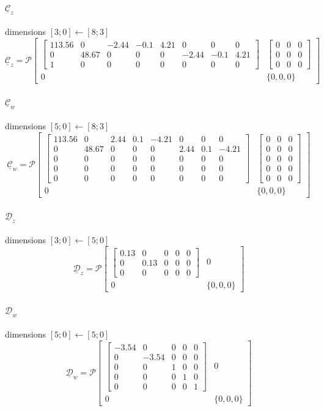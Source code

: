 \documentclass{article}
\newcommand{\PIop}[6]{\mathcal P\!\left[\begin{array}{c|c}#1&#2\\\hline#3&\{#4,#5,#6\}\end{array}\right]}
\begin{document}
\paragraph{$\underline{\mathcal C}_z$}\hfill dimensions $[3;0]\leftarrow[8;3]$
\[\displaystyle \underline{\mathcal C}_z=\PIop{\begin{bmatrix}113.56 & 0 & -2.44 & -0.1 & 4.21 & 0 & 0 & 0\\0 & 48.67 & 0 & 0 & 0 & -2.44 & -0.1 & 4.21\\1 & 0 & 0 & 0 & 0 & 0 & 0 & 0\end{bmatrix}}{\begin{bmatrix}0 & 0 & 0\\0 & 0 & 0\\0 & 0 & 0\end{bmatrix}}{0}{0}{0}{0}\]
\paragraph{$\underline{\mathcal C}_w$}\hfill dimensions $[5;0]\leftarrow[8;3]$
\[\displaystyle \underline{\mathcal C}_w=\PIop{\begin{bmatrix}113.56 & 0 & 2.44 & 0.1 & -4.21 & 0 & 0 & 0\\0 & 48.67 & 0 & 0 & 0 & 2.44 & 0.1 & -4.21\\0 & 0 & 0 & 0 & 0 & 0 & 0 & 0\\0 & 0 & 0 & 0 & 0 & 0 & 0 & 0\\0 & 0 & 0 & 0 & 0 & 0 & 0 & 0\end{bmatrix}}{\begin{bmatrix}0 & 0 & 0\\0 & 0 & 0\\0 & 0 & 0\\0 & 0 & 0\\0 & 0 & 0\end{bmatrix}}{0}{0}{0}{0}\]
\paragraph{$\underline{\mathcal D}_z$}\hfill dimensions $[3;0]\leftarrow[5;0]$
\[\displaystyle \underline{\mathcal D}_z=\PIop{\begin{bmatrix}0.13 & 0 & 0 & 0 & 0\\0 & 0.13 & 0 & 0 & 0\\0 & 0 & 0 & 0 & 0\end{bmatrix}}{0}{0}{0}{0}{0}\]
\paragraph{$\underline{\mathcal D}_w$}\hfill dimensions $[5;0]\leftarrow[5;0]$
\[\displaystyle \underline{\mathcal D}_w=\PIop{\begin{bmatrix}-3.54 & 0 & 0 & 0 & 0\\0 & -3.54 & 0 & 0 & 0\\0 & 0 & 1 & 0 & 0\\0 & 0 & 0 & 1 & 0\\0 & 0 & 0 & 0 & 1\end{bmatrix}}{0}{0}{0}{0}{0}\]
\end{document}
